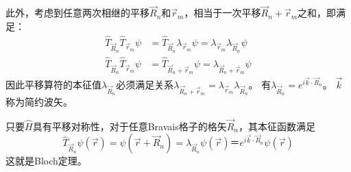 此外，考虑到任意两次相继的平移$\vec R_n$和$\vec r_m$，相当于一次平移$\vec R_n+\vec r_m$之和，即满足：
\begin{equation}
  \begin{aligned}
   \hat T_{\vec R_n}\hat T_{\vec r_m}\psi&=\hat T_{\vec R_n}\lambda_{\vec r_m}\psi=\lambda_{\vec r_m}\lambda_{\vec R_n}\psi \\
   \hat T_{\vec R_n}\hat T_{\vec r_m}\psi&=\hat T_{\vec R_n+\vec r_m}\psi=\lambda_{\vec R_n+\vec r_m}\psi
  \end{aligned}
  \label{eq:solid-26}
\end{equation}
因此平移算符的本征值$\lambda_{\vec R_n}$必须满足关系$\lambda_{\vec R_n+\vec r_m}=\lambda_{\vec r_m}\lambda_{\vec R_n}$。
有$\lambda_{\vec R_n}=e^{i\vec k\cdot\vec R_n}$。
$\vec k$称为简约波矢。


只要$\hat H$具有平移对称性，对于任意Bravais格子的格矢$\vec R_n$，其本征函数满足
\begin{equation}
  \hat T_{\vec R_n}\psi(\vec r)=\psi(\vec r+\vec R_n)=\lambda_{\vec R_n}\psi(\vec r)＝e^{i\vec k\cdot\vec R_n}\psi(\vec r)
  \label{eq:solid-30}
\end{equation}
这就是Bloch定理。


